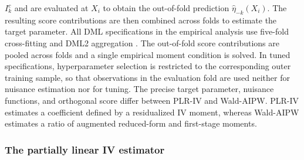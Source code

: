 \documentclass[12pt, a4paper, oneside]{article}
\theoremstyle{plain}
\theoremstyle{definition}
\begin{document}
$I_k^c$ and are evaluated at $X_i$ to obtain the out-of-fold prediction
$\widehat{\eta}_{-k}(X_i)$. The resulting score contributions are then combined
across folds to estimate the target parameter.
All DML specifications in the empirical analysis use five-fold cross-fitting
and DML2 aggregation \citep[Remark~3.1]{chernozhukov2018double}. The
out-of-fold score contributions are pooled across folds and a single empirical
moment condition is solved. In tuned specifications, hyperparameter selection
is restricted to the corresponding outer training sample, so that observations
in the evaluation fold are used neither for nuisance estimation nor for
tuning.
The precise target parameter, nuisance functions, and orthogonal score differ between PLR-IV and Wald-AIPW. PLR-IV estimates a coefficient defined by a residualized IV moment, whereas Wald-AIPW estimates a ratio of augmented reduced-form and first-stage moments. 



\subsubsection{The partially linear IV estimator}
\label{subsec:pliv}
\end{document}
